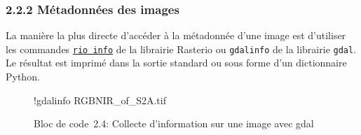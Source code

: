 \documentclass[
]{article}
\newenvironment{Shaded}{}{}
\newcommand{\NormalTok}[1]{#1}
\newcommand{\OperatorTok}[1]{\textcolor[rgb]{0.40,0.40,0.40}{#1}}
\begin{document}
\subsubsection{\texorpdfstring{{2.2.2} Métadonnées des
images}{2.2.2 Métadonnées des images}}\label{muxe9tadonnuxe9es-des-images}

La manière la plus directe d'accéder à la métadonnée d'une image est
d'utiliser les commandes
\href{https://rasterio.readthedocs.io/en/stable/cli.html\#info}{\texttt{rio\ info}}
de la librairie Rasterio ou \texttt{gdalinfo} de la librairie
\texttt{gdal}. Le résultat est imprimé dans la sortie standard ou sous
forme d'un dictionnaire Python.

\label{1b6d0b80}
\label{lst-gdalinfo}
\begin{figure}
\centering
{}\label{lst-gdalinfo}
\begin{Shaded}
\begin{Highlighting}[]
\OperatorTok{!}\NormalTok{gdalinfo RGBNIR\_of\_S2A.tif}
\end{Highlighting}
\end{Shaded}
\caption{Bloc de code~2.4: Collecte d'information sur une image avec
gdal}
\end{figure}
\end{document}
